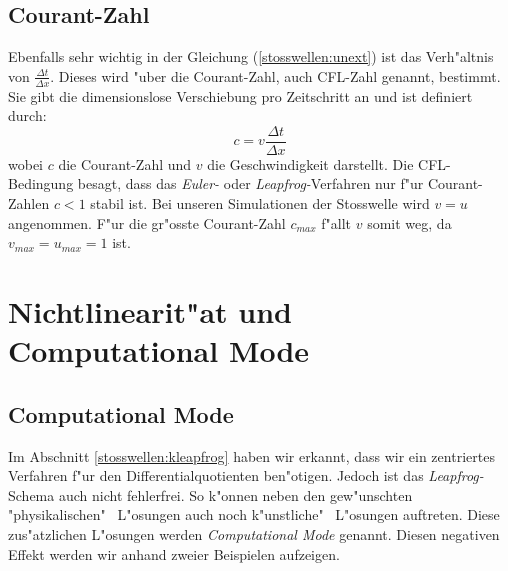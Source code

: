 \begin{refsection}
\subsection{Courant-Zahl}
Ebenfalls sehr wichtig in der Gleichung (\ref{stosswellen:unext}) ist
das Verh"altnis von $\frac{\Delta t}{\Delta x}$. Dieses wird "uber die
Courant-Zahl, auch CFL-Zahl\cite{stoss:cfl} genannt, bestimmt. Sie gibt
die dimensionslose Verschiebung pro Zeitschritt an und ist definiert
durch: 
\[
c=v\frac{\Delta t}{\Delta x}
\]
wobei $c$ die Courant-Zahl und $v$ die Geschwindigkeit
darstellt. Die CFL-Bedingung besagt, dass das \textit{Euler-}
oder \textit{Leapfrog-}Verfahren nur f"ur Courant-Zahlen $c\!<\!1$
stabil ist. Bei unseren Simulationen der Stosswelle wird $v\!=\!u$
angenommen. F"ur die gr"osste Courant-Zahl $c_{max}$ f"allt $v$ somit weg,
da $v_{max}\!=\!u_{max}\!=\!1$ ist.


\section{Nichtlinearit"at und Computational Mode}
\label{stosswellen:nichtlinearit"at}
\subsection{Computational Mode}
Im Abschnitt \ref{stosswellen:kleapfrog} haben wir erkannt, dass wir ein
zentriertes Verfahren f"ur den Differentialquotienten ben"otigen. Jedoch
ist das \textit{Leapfrog-}Schema auch nicht fehlerfrei. So k"onnen
neben den gew"unschten "physikalischen" \, L"osungen auch noch \grqq
k"unstliche" \, L"osungen auftreten. Diese zus"atzlichen L"osungen werden
\textit{Computational Mode} genannt. Diesen negativen Effekt werden wir
anhand zweier Beispielen aufzeigen.


\end{refsection}

